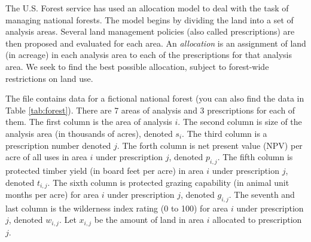 The U.S. Forest service has used an allocation model to deal with the task of managing national forests. 
The model begins by dividing the land into a set of analysis areas. Several land management policies (also 
called prescriptions) are then proposed and evaluated for each area. 
An \emph{allocation} is an assignment of land (in acreage) in each analysis area to each of the 
prescriptions for that analysis area.
We seek to find the best possible allocation, subject to forest-wide restrictions on land use.

The file  contains data for a fictional national forest (you can also find the data
in Table \ref{tab:forest}). There are 7 areas of analysis and 3 prescriptions for each of them. 
The first column is the area of analysis $i$. The second column is size of the analysis area (in thousands of acres), denoted $s_i$. The third column is a prescription number denoted $j$. The forth column is net present value (NPV) per acre of all uses in area $i$ under prescription $j$, denoted $p_{i,j}$. The fifth column is protected timber yield (in board feet per acre) in area $i$ under prescription $j$, denoted $t_{i,j}$. The sixth column is protected grazing capability (in animal unit months per acre) for area $i$ under prescription $j$, denoted
$g_{i,j}$. The seventh and last column is the wilderness index rating (0 to 100) for area $i$ under prescription $j$, denoted $w_{i,j}$. Let $x_{i,j}$ be the amount of land in area $i$ allocated to prescription $j$.

